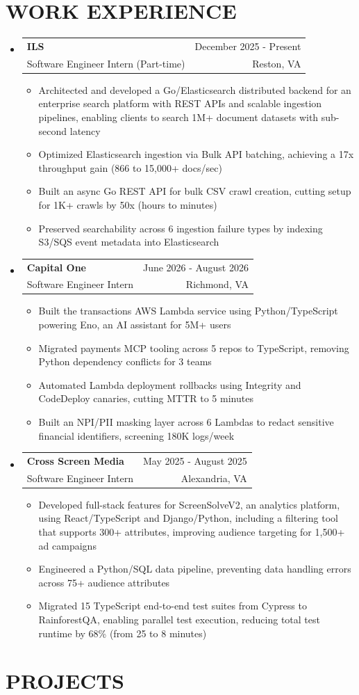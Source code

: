 \documentclass[letterpaper,11pt]{article}
\makeatletter
\newcommand{\resumeItem}[1]{
  \item\small{
    {#1 \vspace{-2pt}}
  }
}
\newcommand{\resumeSubheading}[4]{
  \vspace{-2pt}\item
    \begin{tabular*}{1\textwidth}[t]{l@{\extracolsep{\fill}}r}
      \textbf{#1} & #2 \\
      {\small#3} & {\small #4} \\
    \end{tabular*}\vspace{-7pt}
}
\newcommand{\resumeSubHeadingListStart}{\begin{itemize}[leftmargin=0in, label={}]}
\newcommand{\resumeSubHeadingListEnd}{\end{itemize}}
\newcommand{\resumeItemListStart}{\begin{itemize}}
\newcommand{\resumeItemListEnd}{\end{itemize}\vspace{-4pt}}
\makeatother
\begin{document}
\section{WORK EXPERIENCE}
  \resumeSubHeadingListStart
      \resumeSubheading
      {ILS}{December 2025 - Present}
      {Software Engineer Intern (Part-time)}{Reston, VA}
       \resumeItemListStart
       \resumeItem{Architected and developed a Go/Elasticsearch distributed backend for an enterprise search platform with REST APIs and  scalable ingestion pipelines, enabling clients to search 1M+ document datasets with sub-second latency}
        \resumeItem{Optimized Elasticsearch ingestion via Bulk API batching, achieving a 17x throughput gain (866 to 15,000+ docs/sec)}
        \resumeItem{Built an async Go REST API for bulk CSV crawl creation, cutting setup for 1K+ crawls by 50x (hours to minutes)}
        \resumeItem{Preserved searchability across 6 ingestion failure types by indexing S3/SQS event metadata into Elasticsearch}
      \resumeItemListEnd
      \resumeSubheading
      {Capital One}{June 2026 - August 2026}
      {Software Engineer Intern}{Richmond, VA}
        \resumeItemListStart
        \resumeItem{Built the transactions AWS Lambda service using Python/TypeScript powering Eno, an AI assistant for 5M+ users}
        \resumeItem{Migrated payments MCP tooling across 5 repos to TypeScript, removing Python dependency conflicts for 3 teams}
        \resumeItem{Automated Lambda deployment rollbacks using Integrity and CodeDeploy canaries, cutting MTTR to 5 minutes}
        \resumeItem{Built an NPI/PII masking layer across 6 Lambdas to redact sensitive financial identifiers, screening 180K logs/week}
    \resumeItemListEnd
    \resumeSubheading
      {Cross Screen Media}{May 2025 - August 2025}
      {Software Engineer Intern}{Alexandria, VA}
      \resumeItemListStart
        \resumeItem{Developed full-stack features for ScreenSolveV2, an analytics platform, using React/TypeScript and Django/Python, including a filtering tool that supports 300+ attributes, improving audience targeting for 1,500+ ad campaigns}
        \resumeItem{Engineered a Python/SQL data pipeline, preventing data handling errors across 75+ audience attributes}
        \resumeItem{Migrated 15 TypeScript end-to-end test suites from Cypress to RainforestQA, enabling parallel test execution, reducing total test runtime by 68\% (from 25 to 8 minutes)}
      \resumeItemListEnd
  \resumeSubHeadingListEnd

\section{PROJECTS}
\end{document}
